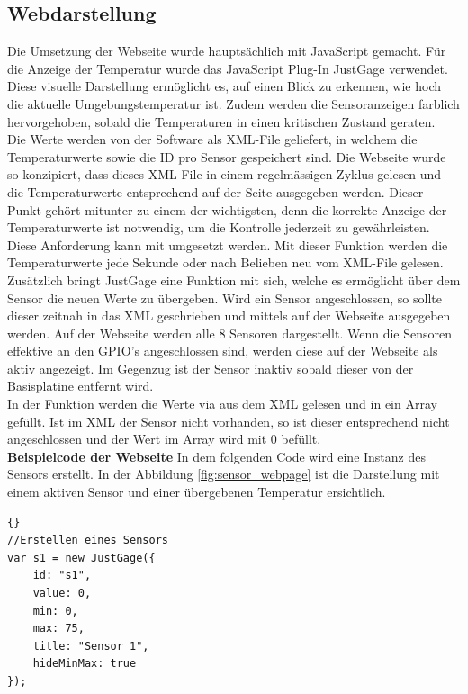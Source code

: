 \subsection{Webdarstellung}
Die Umsetzung der Webseite wurde hauptsächlich mit JavaScript gemacht.
Für die Anzeige der Temperatur wurde das JavaScript Plug-In JustGage verwendet. Diese visuelle Darstellung ermöglicht es, auf einen Blick zu erkennen, wie hoch die aktuelle Umgebungstemperatur ist. Zudem werden die Sensoranzeigen farblich hervorgehoben, sobald die Temperaturen in einen kritischen Zustand geraten.\\
Die Werte werden von der Software als XML-File geliefert, in welchem die Temperaturwerte sowie die ID pro Sensor gespeichert sind. Die Webseite wurde so konzipiert, dass dieses XML-File in einem regelmässigen Zyklus gelesen und die Temperaturwerte entsprechend auf der Seite ausgegeben werden. Dieser Punkt gehört mitunter zu einem der wichtigsten, denn die korrekte Anzeige der Temperaturwerte ist notwendig, um die Kontrolle jederzeit zu gewährleisten. Diese Anforderung kann mit  umgesetzt werden. Mit dieser Funktion werden die Temperaturwerte jede Sekunde oder nach Belieben neu vom XML-File gelesen.\\
Zusätzlich bringt JustGage eine Funktion mit sich, welche es ermöglicht über  dem Sensor die neuen Werte zu übergeben. Wird ein Sensor angeschlossen, so sollte dieser zeitnah in das XML geschrieben und mittels  auf der Webseite ausgegeben werden. Auf der Webseite werden alle 8 Sensoren dargestellt. Wenn die Sensoren effektive an den GPIO's angeschlossen sind,  werden diese auf der Webseite als \grqq{}aktiv\glqq{} angezeigt. Im Gegenzug ist der Sensor \grqq{}inaktiv\glqq{} sobald dieser von der Basisplatine entfernt wird.\\
In der Funktion  werden die Werte via  aus dem XML gelesen und in ein Array gefüllt. Ist im XML der Sensor nicht vorhanden, so ist dieser entsprechend nicht angeschlossen und der Wert im Array wird mit 0 befüllt.\\

\textbf{Beispielcode der Webseite}\newline 
In dem folgenden Code wird eine Instanz des Sensors erstellt. In der Abbildung \ref{fig:sensor_webpage} ist die Darstellung mit einem aktiven Sensor und einer übergebenen Temperatur ersichtlich. 
\begin{lstlisting}{}
//Erstellen eines Sensors
var s1 = new JustGage({
	id: "s1",
	value: 0,
	min: 0,
	max: 75,
	title: "Sensor 1",
	hideMinMax: true
});
\end{lstlisting}

